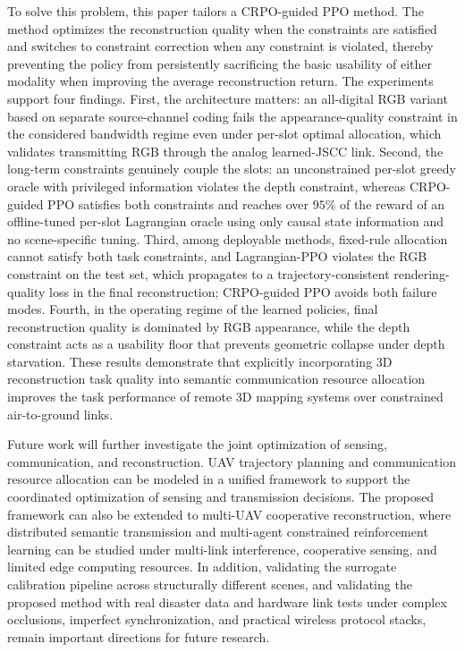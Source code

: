\documentclass[journal]{IEEEtran}
\begin{document}
To solve this problem, this paper tailors a CRPO-guided PPO method. The method optimizes the reconstruction quality when the constraints are satisfied and switches to constraint correction when any constraint is violated, thereby preventing the policy from persistently sacrificing the basic usability of either modality when improving the average reconstruction return. The experiments support four findings. First, the architecture matters: an all-digital RGB variant based on separate source-channel coding fails the appearance-quality constraint in the considered bandwidth regime even under per-slot optimal allocation, which validates transmitting RGB through the analog learned-JSCC link. Second, the long-term constraints genuinely couple the slots: an unconstrained per-slot greedy oracle with privileged information violates the depth constraint, whereas CRPO-guided PPO satisfies both constraints and reaches over $95\%$ of the reward of an offline-tuned per-slot Lagrangian oracle using only causal state information and no scene-specific tuning. Third, among deployable methods, fixed-rule allocation cannot satisfy both task constraints, and Lagrangian-PPO violates the RGB constraint on the test set, which propagates to a trajectory-consistent rendering-quality loss in the final reconstruction; CRPO-guided PPO avoids both failure modes. Fourth, in the operating regime of the learned policies, final reconstruction quality is dominated by RGB appearance, while the depth constraint acts as a usability floor that prevents geometric collapse under depth starvation. These results demonstrate that explicitly incorporating 3D reconstruction task quality into semantic communication resource allocation improves the task performance of remote 3D mapping systems over constrained air-to-ground links.

Future work will further investigate the joint optimization of sensing, communication, and reconstruction. UAV trajectory planning and communication resource allocation can be modeled in a unified framework to support the coordinated optimization of sensing and transmission decisions. The proposed framework can also be extended to multi-UAV cooperative reconstruction, where distributed semantic transmission and multi-agent constrained reinforcement learning can be studied under multi-link interference, cooperative sensing, and limited edge computing resources. In addition, validating the surrogate calibration pipeline across structurally different scenes, and validating the proposed method with real disaster data and hardware link tests under complex occlusions, imperfect synchronization, and practical wireless protocol stacks, remain important directions for future research.
\end{document}
